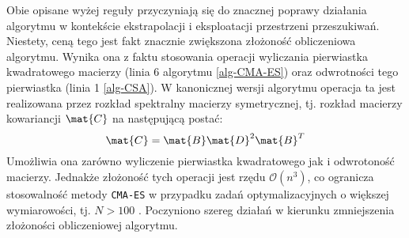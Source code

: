   Obie opisane wyżej reguły przyczyniają się do znacznej poprawy działania algorytmu w kontekście ekstrapolacji i eksploatacji przestrzeni przeszukiwań. Niestety, ceną tego jest fakt znacznie zwiększona złożoność obliczeniowa algorytmu. Wynika ona z faktu stosowania operacji wyliczania pierwiastka kwadratowego macierzy (linia 6 algorytmu \ref{alg-CMA-ES}) oraz odwrotności tego pierwiastka (linia 1 \ref{alg-CSA}).
  W kanonicznej wersji algorytmu operacja ta jest realizowana przez rozkład spektralny macierzy symetrycznej, tj. rozkład macierzy kowariancji $\mat{C}$ na następującą postać:
  \begin{equation}
    \mat{C} = \mat{B}\mat{D}^{2}\mat{B}^{T}
  \end{equation}
  Umożliwia ona zarówno wyliczenie pierwiastka kwadratowego jak i odwrotoność macierzy. Jednakże złożoność tych operacji jest rzędu $\mathcal{O}(n^3)$, co ogranicza stosowalność metody \texttt{CMA-ES} w przypadku zadań optymalizacyjnych o większej wymiarowości, tj. $N > 100$ \cite{cma-es-tutorial}.
  Poczyniono szereg działań w kierunku zmniejszenia złożoności obliczeniowej algorytmu. 


